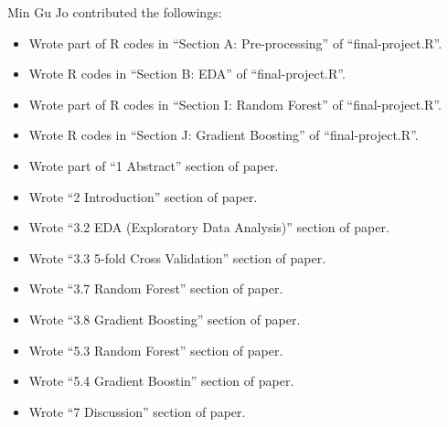 \documentclass[letterpaper,twocolumn,11pt]{article}
\begin{document}
Min Gu Jo contributed the followings:
\begin{itemize}
\item Wrote part of R codes in ``Section A: Pre-processing'' of ``final-project.R''.
\item Wrote R codes in ``Section B: EDA'' of ``final-project.R''.
\item Wrote part of R codes in ``Section I: Random Forest'' of ``final-project.R''.
  \item Wrote R codes in ``Section J: Gradient Boosting'' of ``final-project.R''.
\item Wrote part of ``1 Abstract'' section of paper.
\item Wrote ``2 Introduction'' section of paper.
\item Wrote ``3.2 EDA (Exploratory Data Analysis)'' section of paper.
\item Wrote ``3.3 5-fold Cross Validation'' section of paper.
\item Wrote ``3.7 Random Forest'' section of paper.
\item Wrote ``3.8 Gradient Boosting'' section of paper.
\item Wrote ``5.3 Random Forest'' section of paper.
\item Wrote ``5.4 Gradient Boostin'' section of paper.
\item Wrote ``7 Discussion'' section of paper.
  
\end{itemize}
\end{document}
